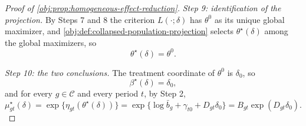 \documentclass[11pt]{article}
\begin{document}
\begin{proof}[Proof of \cref{obj:prop:homogeneous-effect-reduction}]
\textit{Step 9: identification of the projection.} By Steps 7 and 8 the criterion \(L(\cdot;\delta)\) has \(\theta^0\) as its unique global maximizer, and \cref{obj:def:collapsed-population-projection} selects \(\theta^\star(\delta)\) among the global maximizers, so
\[
\theta^\star(\delta)=\theta^0 .
\]

\textit{Step 10: the two conclusions.} The treatment coordinate of \(\theta^0\) is \(\delta_0\), so
\[
\beta^\star(\delta)=\delta_0 ,
\]
and for every \(g\in\mathcal C\) and every period \(t\), by Step 2,
\[
\mu^\star_{gt}(\delta)
=
\exp\{\eta_{gt}(\theta^\star(\delta))\}
=
\exp\{\log\bar b_g+\gamma_{t0}+D_{gt}\delta_0\}
=
B_{gt}\exp(D_{gt}\delta_0).
\]
\end{proof}
\end{document}
